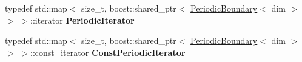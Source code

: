 \begin{DoxyCompactItemize}
\item 
\hypertarget{classnatrium_1_1BoundaryCollection_a9c641c34778fdb95ff98827c818773e6}{
typedef std::map$<$ size\_\-t, boost::shared\_\-ptr$<$ \hyperlink{classnatrium_1_1PeriodicBoundary}{PeriodicBoundary}$<$ dim $>$ $>$ $>$::iterator {\bfseries PeriodicIterator}}
\label{classnatrium_1_1BoundaryCollection_a9c641c34778fdb95ff98827c818773e6}

\item 
\hypertarget{classnatrium_1_1BoundaryCollection_aa3e1ff6ad230abd5fb3cedc303e00678}{
typedef std::map$<$ size\_\-t, boost::shared\_\-ptr$<$ \hyperlink{classnatrium_1_1PeriodicBoundary}{PeriodicBoundary}$<$ dim $>$ $>$ $>$::const\_\-iterator {\bfseries ConstPeriodicIterator}}
\label{classnatrium_1_1BoundaryCollection_aa3e1ff6ad230abd5fb3cedc303e00678}

\end{DoxyCompactItemize}
